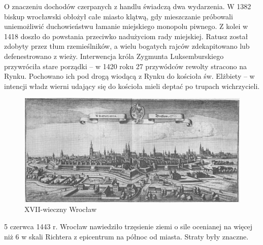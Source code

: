 \documentclass{article}
\begin{document}
O znaczeniu dochodów czerpanych z handlu świadczą dwa wydarzenia. W 1382 biskup wrocławski obłożył całe miasto klątwą, gdy mieszczanie próbowali uniemożliwić duchowieństwu łamanie miejskiego monopolu piwnego. Z kolei w 1418 doszło do powstania przeciwko nadużyciom rady miejskiej. Ratusz został zdobyty przez tłum rzemieślników, a wielu bogatych rajców zdekapitowano lub defenestrowano z wieży. Interwencja króla Zygmunta Luksemburskiego przywróciła stare porządki – w 1420 roku 27 przywódców rewolty stracono na Rynku. Pochowano ich pod drogą wiodącą z Rynku do kościoła św. Elżbiety – w intencji władz wierni udający się do kościoła mieli deptać po trupach wichrzycieli.
 \begin{figure}[h!]
\centering
\includegraphics[scale=0.4]{3.jpg}
\caption{XVII-wieczny Wrocław}
\end{figure}

5 czerwca 1443 r. Wrocław nawiedziło trzęsienie ziemi o sile ocenianej na więcej niż 6 w skali Richtera z epicentrum na północ od miasta. Straty były znaczne.
\end{document}
